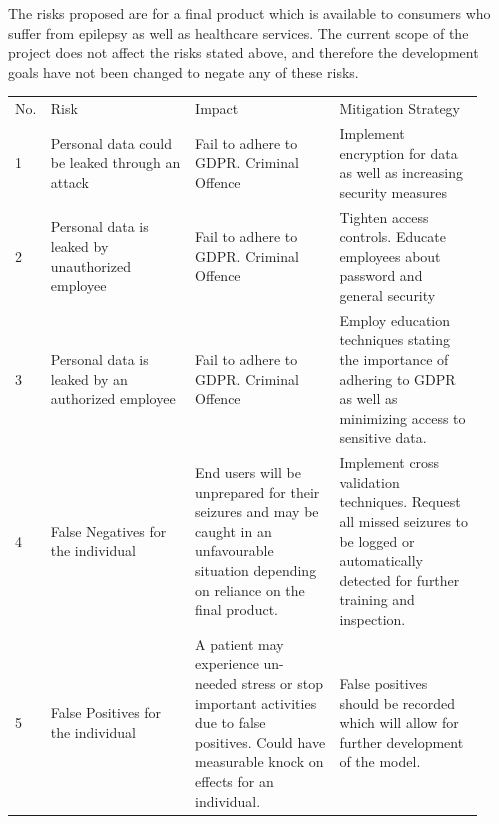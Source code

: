 \documentclass[12pt]{article}
\begin{document}
The risks proposed are for a final product which is available to consumers who suffer from epilepsy as well as healthcare services. The current scope of the project does not affect the risks stated above, and therefore the development goals have not been changed to negate any of these risks.

\begin{table}[H]
\centering
\begin{tabular}{p{0.03\linewidth}p{0.3\linewidth}p{0.3\linewidth}p{0.3\linewidth}}
No. & Risk                                              & Impact                                                                                                                                                   & Mitigation Strategy                                                                                                                           \\
1 & Personal data could be leaked through an attack   & Fail to adhere to GDPR. Criminal Offence                                                                                                                 & Implement encryption for data as well as increasing security measures                                                                          \\
2 & Personal data is leaked by unauthorized employee  & Fail to adhere to GDPR. Criminal Offence                                                                                                                 & Tighten access controls. Educate employees about password and general security                                                                 \\
3 & Personal data is leaked by an authorized employee & Fail to adhere to GDPR. Criminal Offence                                                                                                                 & Employ education techniques stating the importance of adhering to GDPR as well as minimizing access to sensitive data.                        \\
4 & False Negatives for the individual                                   & End users will be unprepared for their seizures and may be caught in an unfavourable situation depending on reliance on the final product.               & Implement cross validation techniques. Request all missed seizures to be logged or automatically detected for further training and inspection. \\
5 & False Positives for the individual                                  & A patient may experience un-needed stress or stop important activities due to false positives. Could have measurable knock on effects for an individual. & False positives should be recorded which will allow for further development of the model.                                                      \\

\end{tabular}
\end{table}
\end{document}
